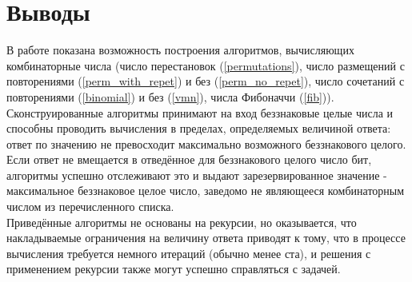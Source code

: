 \documentclass[zuev-report.tex]{subfiles}
\begin{document}
\section{Выводы}
В работе показана возможность построения алгоритмов, вычисляющих комбинаторные числа (число перестановок (\ref{permutations}), число размещений с повторениями (\ref{perm_with_repet}) и без (\ref{perm_no_repet}), число сочетаний с повторениями (\ref{binomial}) и без (\ref{vmn}), числа Фибоначчи (\ref{fib})). Сконструированные алгоритмы принимают на вход беззнаковые целые числа и способны проводить вычисления в пределах, определяемых величиной ответа: ответ по значению не превосходит максимально возможного беззнакового целого. Если ответ не вмещается в отведённое для беззнакового целого число бит, алгоритмы успешно отслеживают это и выдают зарезервированное значение - максимальное беззнаковое целое число, заведомо не являющееся комбинаторным числом из перечисленного списка.\\ Приведённые алгоритмы не основаны на рекурсии, но оказывается, что накладываемые ограничения на величину ответа приводят к тому, что в процессе вычисления требуется немного итераций (обычно менее ста), и решения с применением рекурсии также могут успешно справляться с задачей.
\end{document}
